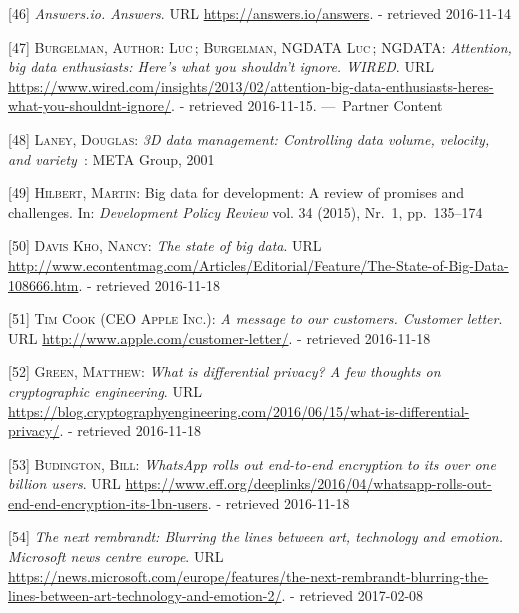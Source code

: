 \documentclass[12pt,english,a4paper,titlepage,cleardoublepage=empty,dottedtoc]{report}
\begin{document}
\hypertarget{ref-web_2016_answers-io}{}
{[}46{]} \emph{Answers.io. Answers}. URL
\url{https://answers.io/answers}. - retrieved 2016-11-14

\hypertarget{ref-web_2016_big-data-enthusiasts-should-not-ignore}{}
{[}47{]} \textsc{Burgelman, Author: Luc}\,; \textsc{Burgelman, NGDATA
Luc}\,; \textsc{NGDATA}: \emph{Attention, big data enthusiasts: Here's
what you shouldn't ignore. WIRED}. URL
\url{https://www.wired.com/insights/2013/02/attention-big-data-enthusiasts-heres-what-you-shouldnt-ignore/}.
- retrieved 2016-11-15. ---~Partner Content

\hypertarget{ref-report_2001_3d-data-management-controlling-data-volume-velocity-and-variety}{}
{[}48{]} \textsc{Laney, Douglas}: \emph{3D data management: Controlling
data volume, velocity, and variety}~: META Group, 2001

\hypertarget{ref-paper_2015_big-data-for-development-a-review-of-promises-and-challenges:more-data}{}
{[}49{]} \textsc{Hilbert, Martin}: Big data for development: A review of
promises and challenges. In: \emph{Development Policy Review} vol. 34
(2015), Nr.~1, pp.~135--174

\hypertarget{ref-web_2016_the-state-of-big-data}{}
{[}50{]} \textsc{Davis Kho, Nancy}: \emph{The state of big data}. URL
\url{http://www.econtentmag.com/Articles/Editorial/Feature/The-State-of-Big-Data-108666.htm}.
- retrieved 2016-11-18

\hypertarget{ref-web_2016_apple_customer-letter}{}
{[}51{]} \textsc{Tim Cook (CEO Apple Inc.)}: \emph{A message to our
customers. Customer letter}. URL
\url{http://www.apple.com/customer-letter/}. - retrieved 2016-11-18

\hypertarget{ref-web_2016_what-is-differential-privacy}{}
{[}52{]} \textsc{Green, Matthew}: \emph{What is differential privacy? A
few thoughts on cryptographic engineering}. URL
\url{https://blog.cryptographyengineering.com/2016/06/15/what-is-differential-privacy/}.
- retrieved 2016-11-18

\hypertarget{ref-web_2016_eff_whatsapp-rolls-out-emd-to-end-encryption}{}
{[}53{]} \textsc{Budington, Bill}: \emph{WhatsApp rolls out end-to-end
encryption to its over one billion users}. URL
\url{https://www.eff.org/deeplinks/2016/04/whatsapp-rolls-out-end-end-encryption-its-1bn-users}.
- retrieved 2016-11-18

\hypertarget{ref-web_2016_research-experiment_ai-rembrandt}{}
{[}54{]} \emph{The next rembrandt: Blurring the lines between art,
technology and emotion. Microsoft news centre europe}. URL
\url{https://news.microsoft.com/europe/features/the-next-rembrandt-blurring-the-lines-between-art-technology-and-emotion-2/}.
- retrieved 2017-02-08
\end{document}
